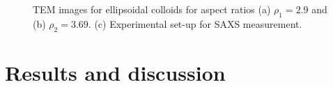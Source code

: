 \documentclass[aps,prl,preprint,superscriptaddress,showkeys]{revtex4-2} %
\begin{document}
\begin{figure}[!h]
\caption{TEM images for ellipsoidal colloids for aspect ratios (a) $\rho_1=2.9$ and (b) $\rho_2=3.69$. (c) Experimental set-up for SAXS measurement.}\label{TEM}
\end{figure}
\section{Results and discussion}
\end{document}
